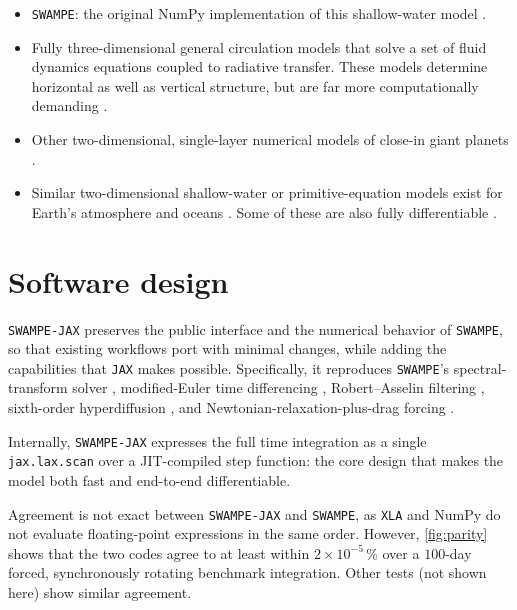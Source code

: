 \documentclass[10pt,a4paper,onecolumn]{article}
\providecommand{\tightlist}{\setlength{\itemsep}{0pt}\setlength{\parskip}{0pt}}
\begin{document}
\begin{itemize}
\tightlist
\item \texttt{SWAMPE}: the original NumPy implementation of this shallow-water model \citep{Landgren:2022}.
\item Fully three-dimensional general circulation models that solve a set of fluid dynamics equations coupled to radiative transfer. These models determine horizontal as well as vertical structure, but are far more computationally demanding \citep[e.g.,][]{Carone:2020, Kataria:2016, Roth:2024, Showman:2009}.
\item Other two-dimensional, single-layer numerical models of close-in giant planets \citep[e.g.,][]{Cho:2008, LangtonLaughlin:2008, Menou:2003, Penn:2017}.
\item Similar two-dimensional shallow-water or primitive-equation models exist for Earth's atmosphere and oceans \citep[e.g.,][]{Klower:2024}. Some of these are also fully differentiable \citep[e.g.,][]{Davenport:2026, Kochkov:2024, Moses:2026}.%
\end{itemize}

\section{Software design}

\texttt{SWAMPE-JAX} preserves the public interface and the numerical behavior of \texttt{SWAMPE}, so that existing workflows port with minimal changes, while adding the capabilities that \texttt{JAX} makes possible. Specifically, it reproduces \texttt{SWAMPE}'s spectral-transform solver \citep{Hack:1992}, modified-Euler time differencing \citep{Langton:2008}, Robert--Asselin filtering \citep{Robert:1966,Asselin:1972}, sixth-order hyperdiffusion \citep{Gelb:2001}, and Newtonian-relaxation-plus-drag forcing \citep{ShowmanGuillot:2002}.

Internally, \texttt{SWAMPE-JAX} expresses the full time integration as a single \texttt{jax.lax.scan} over a JIT-compiled step function: the core design that makes the model both fast and end-to-end differentiable.

Agreement is not exact between \texttt{SWAMPE-JAX} and \texttt{SWAMPE}, as \texttt{XLA} and NumPy do not evaluate floating-point expressions in the same order. However, \autoref{fig:parity} shows that the two codes agree to at least within $2\times10^{-5}\,\%$ over a $100$-day forced, synchronously rotating benchmark integration. Other tests (not shown here) show similar agreement.
\end{document}

